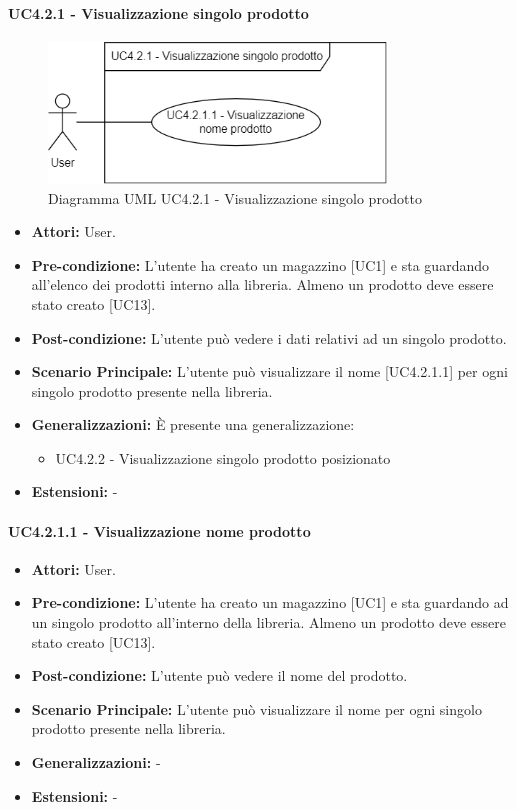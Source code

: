 \paragraph{UC4.2.1 - Visualizzazione singolo prodotto}
\begin{figure}[H]
  \centering
  \includegraphics[width=0.8\textwidth]{UC_diagrams_1-10/UC4.2.1.drawio.png}
   \caption{Diagramma UML UC4.2.1 - Visualizzazione singolo prodotto}
\end{figure}
\begin{itemize} 
    \item \textbf{Attori:} User.
    \item \textbf{Pre-condizione:}  L'utente ha creato un magazzino [UC1] e sta guardando all'elenco dei prodotti interno alla libreria. Almeno un prodotto deve essere stato creato [UC13].
    \item \textbf{Post-condizione:} L'utente può vedere i dati relativi ad un singolo prodotto.
    \item \textbf{Scenario Principale:} L'utente può visualizzare il nome [UC4.2.1.1] per ogni singolo prodotto presente nella libreria. 
    \item \textbf{Generalizzazioni:} È presente una generalizzazione:
    \begin{itemize}
        \item UC4.2.2 - Visualizzazione singolo prodotto posizionato
    \end{itemize}
    \item \textbf{Estensioni:} -
\end{itemize}


\paragraph{UC4.2.1.1 - Visualizzazione nome prodotto}
\begin{itemize} 
    \item \textbf{Attori:} User.
    \item \textbf{Pre-condizione:}  L'utente ha creato un magazzino [UC1] e sta guardando ad un singolo prodotto all'interno della libreria. Almeno un prodotto deve essere stato creato [UC13].
    \item \textbf{Post-condizione:} L'utente può vedere il nome del prodotto.
    \item \textbf{Scenario Principale:} L'utente può visualizzare il nome per ogni singolo prodotto presente nella libreria. 
    \item \textbf{Generalizzazioni:} -
    \item \textbf{Estensioni:} -
\end{itemize}


